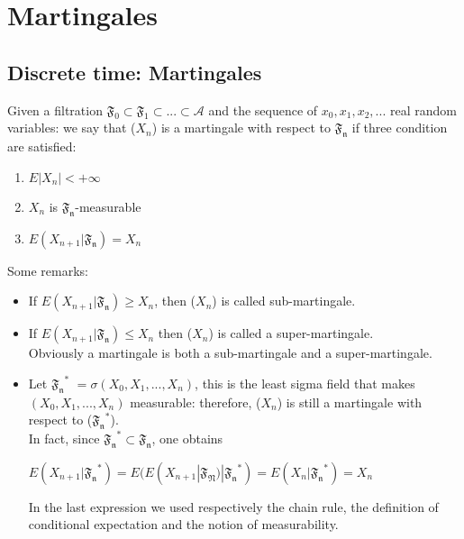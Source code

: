 \chapter{Martingales}
\vspace*{0.5cm}
\setcounter{page}{1}

\section{Discrete time: Martingales}

\begin{definition}
Given a filtration $\mathfrak{F_0} \subset \mathfrak{F_1} \subset ... \subset \mathcal{A}$ and the sequence of $x_0,x_1,x_2,...$ real random variables: we say that ($X_n$) is a martingale with respect to $\mathfrak{F_n}$ if three condition are satisfied:
\begin{enumerate}
    \item $E|X_n| < +\infty$
    \item $X_n$ is $\mathfrak{F_n}$-measurable
    \item $E(X_{n+1}|\mathfrak{F_n})=X_n$
\end{enumerate}
\end{definition}

Some remarks:
\begin{itemize}
    \item If $E(X_{n+1}|\mathfrak{F_n}) \geq X_n$, then ($X_n$) is called sub-martingale.
    \item If $E(X_{n+1}|\mathfrak{F_n}) \leq X_n$ then ($X_n$) is called a super-martingale. \\
    Obviously a martingale is both a sub-martingale and a super-martingale.
    \item Let $\mathfrak{F_n}^*$ $=\sigma(X_0, X_1,..., X_n)$, this is the least sigma field that makes $(X_0, X_1,..., X_n)$ measurable: therefore, ($X_n$) is still a martingale with respect to ($\mathfrak{F_n}^*$).\\
    In fact, since $\mathfrak{F_n}^* \subset \mathfrak{F_n}$, one obtains 
    \begin{center}
        $E(X_{n+1}|\mathfrak{F_n}^*) = E(E(X_{n+1}|\mathfrak{F_N})|\mathfrak{F_n}^*) = E(X_n | \mathfrak{F_n}^*) = X_n$ 
    \end{center}
    In the last expression we used respectively the chain rule, the definition of conditional expectation and the notion of measurability.
\end{itemize}

